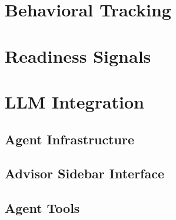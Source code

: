 
\section{Behavioral Tracking}
\label{sec:impl-behavior}


\section{Readiness Signals}
\label{sec:impl-readiness}


\section{LLM Integration}
\label{sec:impl-llm}

\subsection{Agent Infrastructure}
\label{subsec:impl-agent}


\subsection{Advisor Sidebar Interface}
\label{subsec:impl-sidebar}


\subsection{Agent Tools}
\label{subsec:impl-tools}

